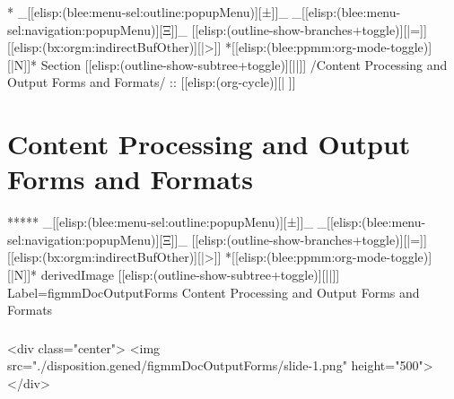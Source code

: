 \begin{whenOrg}
\begin{verblatex}
\begin{frame}[fragile,label=part_outputFormats]
\end{frame}
\end{verblatex}



\begin{whenOrg}
*  _[[elisp:(blee:menu-sel:outline:popupMenu)][±]]_ _[[elisp:(blee:menu-sel:navigation:popupMenu)][Ξ]]_ [[elisp:(outline-show-branches+toggle)][|=]] [[elisp:(bx:orgm:indirectBufOther)][|>]] *[[elisp:(blee:ppmm:org-mode-toggle)][|N]]*  Section    [[elisp:(outline-show-subtree+toggle)][||]]   /Content Processing and Output Forms and Formats/ ::  [[elisp:(org-cycle)][| ]]
\end{whenOrg}

\section{Content Processing and Output Forms and Formats}


\begin{whenOrg}
*****  _[[elisp:(blee:menu-sel:outline:popupMenu)][±]]_ _[[elisp:(blee:menu-sel:navigation:popupMenu)][Ξ]]_ [[elisp:(outline-show-branches+toggle)][|=]] [[elisp:(bx:orgm:indirectBufOther)][|>]] *[[elisp:(blee:ppmm:org-mode-toggle)][|N]]*  derivedImage [[elisp:(outline-show-subtree+toggle)][||]] Label=figmmDocOutputForms Content Processing and Output Forms and Formats
\end{whenOrg}

\begin{htmlonly}

\begin{frame}[fragile,plain,label=figmmDocOutputForms]
    \frametitle{}
    \framesubtitle{}
    \begin{rawhtml}
<div class="center">
<img src="./disposition.gened/figmmDocOutputForms/slide-1.png" height="500">
</div>
    \end{rawhtml}
\end{frame}
\end{htmlonly}

\begin{verblatex}


\end{verblatex}
\end{whenOrg}

